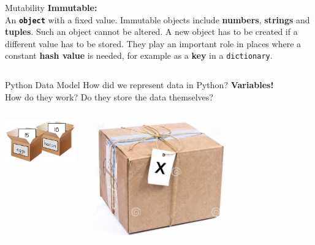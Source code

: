     \begin{frame}{Mutability}
        \huge
        \textbf{Immutable:}\\
        \LARGE
        An \texttt{\textbf{object}} with a fixed value.
        \pause
         Immutable objects include \textbf{numbers}, \textbf{strings} and \textbf{tuples}. Such an object cannot be altered.
        \pause
         A new object has to be created if a different value has to be stored.
        \pause
         They play an important role in places where a constant \textbf{hash value} is needed, for example as a \textbf{key} in a \texttt{dictionary}.
        \pause
        \inputminted[frame=single,framesep=2pt]{python3}{../Lecture5/code-examples/value_update.py}
    \end{frame}

    \begin{frame}{Python Data Model}
        \pause
        \LARGE
        How did we represent data in Python?
        \pause
         \textbf{Variables!}\\
        \pause
        How do they work?
        \pause
         Do they store the data themselves?
        \pause
        \begin{columns}
            \begin{column}{0.5\textwidth}
                \includegraphics[width=0.9\textwidth]{../Lecture5/images/box.jpg}
            \end{column}
            \pause
            \begin{column}{0.5\textwidth}
                \includegraphics[width=0.6\textwidth]{../Lecture5/images/box_tag.jpg}
            \end{column}
        \end{columns}
        
    \end{frame}

